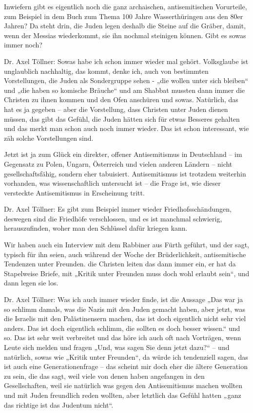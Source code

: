  
Inwiefern gibt es eigentlich noch die ganz archaischen, antisemitischen Vorurteile, zum Beispiel in dem Buch zum Thema 100 Jahre Wasserthüringen aus den 80er Jahren? Da steht drin, die Juden legen deshalb die Steine auf die Gräber, damit, wenn der Messias wiederkommt, sie ihn nochmal steinigen können. Gibt es sowas immer noch? 

 
Dr. Axel Töllner: Sowas habe ich schon immer wieder mal gehört. Volksglaube ist unglaublich nachhaltig, das kommt, denke ich, auch von bestimmten Vorstellungen, die Juden als Sondergruppe sehen - „die wollen unter sich bleiben“ und „die haben so komische Bräuche“ und am Shabbat mussten dann immer die Christen zu ihnen kommen und den Ofen anschüren und sowas. Natürlich, das hat es ja gegeben – aber die Vorstellung, dass Christen unter Juden dienen müssen, das gibt das Gefühl, die Juden hätten sich für etwas Besseres gehalten und das merkt man schon auch noch immer wieder. Das ist schon interessant, wie zäh solche Vorstellungen sind. 

 
Jetzt ist ja zum Glück ein direkter, offener Antisemitismus in Deutschland – im Gegensatz zu Polen, Ungarn, Österreich und vielen anderen Ländern – nicht gesellschaftsfähig, sondern eher tabuisiert. Antisemitismus ist trotzdem weiterhin vorhanden, was wissenschaftlich untersucht ist – die Frage ist, wie dieser versteckte Antisemitismus in Erscheinung tritt. 

 
Dr. Axel Töllner: Es gibt zum Beispiel immer wieder Friedhofsschändungen, deswegen sind die Friedhöfe verschlossen, und es ist manchmal schwierig, herauszufinden, woher man den Schlüssel dafür kriegen kann.  

 Wir haben auch ein Interview mit dem Rabbiner aus Fürth geführt, und der sagt, typisch für ihn seien, auch während der Woche der Brüderlichkeit, antisemitische Tendenzen unter Freunden. die Christen leiten das dann immer ein, er hat da Stapelweise Briefe, mit „Kritik unter Freunden muss doch wohl erlaubt sein“, und dann legen sie los. 

 
Dr. Axel Töllner: Was ich auch immer wieder finde, ist die Aussage „Das war ja so schlimm damals, was die Nazis mit den Juden gemacht haben, aber jetzt, was die Israelis mit den Palästinensern machen, das ist doch eigentlich nicht sehr viel anders. Das ist doch eigentlich schlimm, die sollten es doch besser wissen.“ und so. Das ist sehr weit verbreitet und das höre ich auch oft nach Vorträgen, wenn Leute sich melden und fragen „Und, was sagen Sie denn jetzt dazu?“ – und natürlich, sowas wie „Kritik unter Freunden“, da würde ich tendenziell sagen, das ist auch eine Generationenfrage – das scheint mir doch eher die ältere Generation zu sein, die das sagt, weil viele von denen haben angefangen in den Gesellschaften, weil sie natürlich was gegen den Antisemitismus machen wollten und mit Juden freundlich reden wollten, aber letztlich das Gefühl hatten „ganz das richtige ist das Judentum nicht“. 

